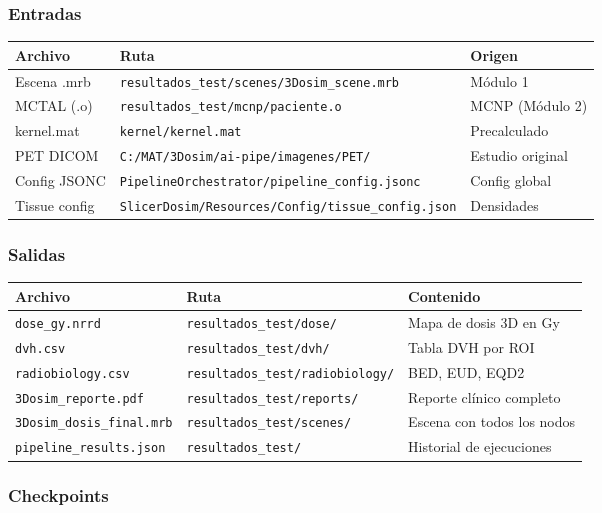 \documentclass[12pt,a4paper]{article}
\begin{document}
\subsubsection{Entradas}

\begin{tabular}{p{4cm} p{5cm} p{4cm}}
\toprule
\textbf{Archivo} & \textbf{Ruta} & \textbf{Origen} \\
\midrule
Escena .mrb & \texttt{resultados\_test/scenes/3Dosim\_scene.mrb} & Módulo 1 \\
MCTAL (.o) & \texttt{resultados\_test/mcnp/paciente.o} & MCNP (Módulo 2) \\
kernel.mat & \texttt{kernel/kernel.mat} & Precalculado \\
PET DICOM & \texttt{C:/MAT/3Dosim/ai-pipe/imagenes/PET/} & Estudio original \\
Config JSONC & \texttt{PipelineOrchestrator/pipeline\_config.jsonc} & Config global \\
Tissue config & \texttt{SlicerDosim/Resources/Config/tissue\_config.json} & Densidades \\
\bottomrule
\end{tabular}

\subsubsection{Salidas}

\begin{tabular}{p{4cm} p{4cm} p{6cm}}
\toprule
\textbf{Archivo} & \textbf{Ruta} & \textbf{Contenido} \\
\midrule
\texttt{dose\_gy.nrrd} & \texttt{resultados\_test/dose/} & Mapa de dosis 3D en Gy \\
\texttt{dvh.csv} & \texttt{resultados\_test/dvh/} & Tabla DVH por ROI \\
\texttt{radiobiology.csv} & \texttt{resultados\_test/radiobiology/} & BED, EUD, EQD2 \\
\texttt{3Dosim\_reporte.pdf} & \texttt{resultados\_test/reports/} & Reporte clínico completo \\
\texttt{3Dosim\_dosis\_final.mrb} & \texttt{resultados\_test/scenes/} & Escena con todos los nodos \\
\texttt{pipeline\_results.json} & \texttt{resultados\_test/} & Historial de ejecuciones \\
\bottomrule
\end{tabular}

\subsubsection{Checkpoints}
\end{document}
